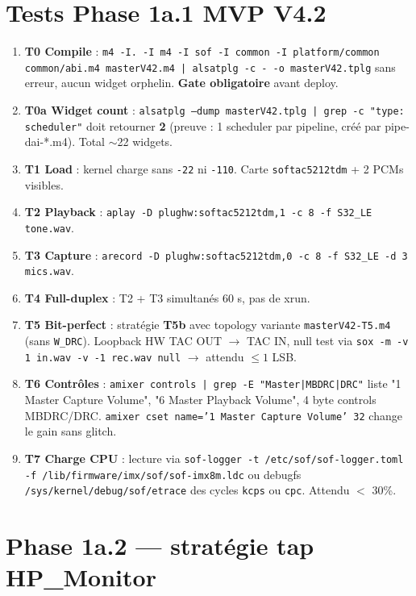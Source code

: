 \documentclass[11pt,a4paper]{article}
\begin{document}
\section{Tests Phase 1a.1 MVP V4.2}

\begin{enumerate}[leftmargin=*, itemsep=2pt]
  \item \textbf{T0 Compile} : \texttt{m4 -I. -I m4 -I sof -I common -I platform/common common/abi.m4 masterV42.m4 | alsatplg -c - -o masterV42.tplg} sans erreur, aucun widget orphelin. \textbf{Gate obligatoire} avant deploy.
  \item \textbf{T0a Widget count} : \texttt{alsatplg --dump masterV42.tplg | grep -c "type: scheduler"} doit retourner \textbf{2} (preuve : 1 scheduler par pipeline, créé par pipe-dai-*.m4). Total $\sim$22 widgets.
  \item \textbf{T1 Load} : kernel charge sans \texttt{-22} ni \texttt{-110}. Carte \texttt{softac5212tdm} + 2 PCMs visibles.
  \item \textbf{T2 Playback} : \texttt{aplay -D plughw:softac5212tdm,1 -c 8 -f S32\_LE tone.wav}.
  \item \textbf{T3 Capture} : \texttt{arecord -D plughw:softac5212tdm,0 -c 8 -f S32\_LE -d 3 mics.wav}.
  \item \textbf{T4 Full-duplex} : T2 + T3 simultanés 60 s, pas de xrun.
  \item \textbf{T5 Bit-perfect} : stratégie \textbf{T5b} avec topology variante \texttt{masterV42-T5.m4} (sans \texttt{W\_DRC}). Loopback HW TAC OUT $\to$ TAC IN, null test via \texttt{sox -m -v 1 in.wav -v -1 rec.wav null} $\to$ attendu $\leq 1$ LSB.
  \item \textbf{T6 Contrôles} : \texttt{amixer controls | grep -E "Master|MBDRC|DRC"} liste "1 Master Capture Volume", "6 Master Playback Volume", 4 byte controls MBDRC/DRC. \texttt{amixer cset name='1 Master Capture Volume' 32} change le gain sans glitch.
  \item \textbf{T7 Charge CPU} : lecture via \texttt{sof-logger -t /etc/sof/sof-logger.toml -f /lib/firmware/imx/sof/sof-imx8m.ldc} ou debugfs \texttt{/sys/kernel/debug/sof/etrace} des cycles \texttt{kcps} ou \texttt{cpc}. Attendu $<$ 30\%.
\end{enumerate}

\section{Phase 1a.2 --- stratégie tap HP\_Monitor}
\end{document}
